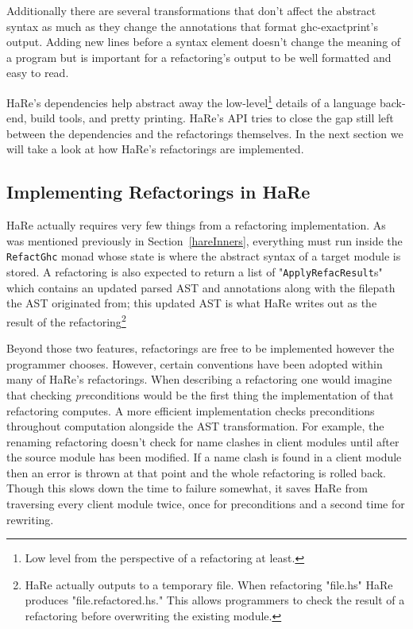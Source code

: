 Additionally there are several transformations that don't affect the abstract syntax as much as they change the annotations that format ghc-exactprint's output. Adding new lines before a syntax element doesn't change the meaning of a program but is important for a refactoring's output to be well formatted and easy to read. 

HaRe's dependencies help abstract away the low-level\footnote{Low level from the perspective of a refactoring at least.} details of a language back-end, build tools, and pretty printing. HaRe's API tries to close the gap still left between the dependencies and the refactorings themselves. In the next section we will take a look at how HaRe's refactorings are implemented.


\subsection{Implementing Refactorings in HaRe}

HaRe actually requires very few things from a refactoring implementation. As was mentioned previously in Section~\ref{hareInners}, everything must run inside the \texttt{RefactGhc} monad whose state is where the abstract syntax of a target module is stored. A refactoring is also expected to return a list of  "\texttt{ApplyRefacResult}s" which contains an updated parsed AST and annotations along with the filepath the AST originated from; this updated AST is what HaRe writes out as the result of the refactoring\footnote{HaRe actually outputs to a temporary file. When refactoring "file.hs" HaRe produces "file.refactored.hs." This allows programmers to check the result of a refactoring before overwriting the existing module.}  

Beyond those two features, refactorings are free to be implemented however the programmer chooses. However, certain conventions have been adopted within many of HaRe's refactorings. When describing a refactoring one would imagine that checking \textit{pre}conditions would be the first thing the implementation of that refactoring computes. A more efficient implementation checks preconditions throughout computation alongside the AST transformation. For example, the renaming refactoring doesn't check for name clashes in client modules until after the source module has been modified. If a name clash is found in a client module then an error is thrown at that point and the whole refactoring is rolled back. Though this slows down the time to failure somewhat, it saves HaRe from traversing every client module twice, once for preconditions and a second time for rewriting.

